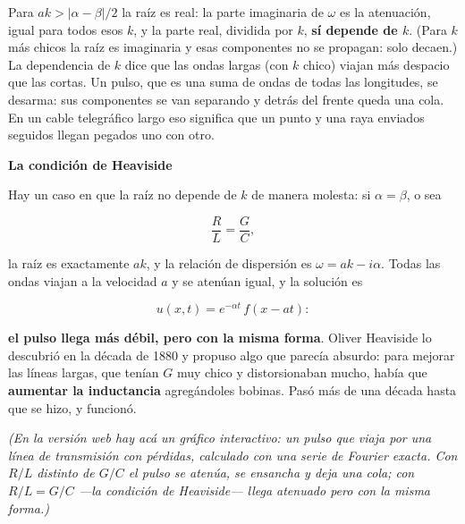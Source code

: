 \documentclass[
  spanish,
  a4paper,
]{scrbook}
\theoremstyle{definition}
\theoremstyle{plain}
\theoremstyle{definition}
\theoremstyle{plain}
\theoremstyle{definition}
\theoremstyle{remark}
\begin{document}
Para \(ak > |\alpha-\beta|/2\) la raíz es real: la parte imaginaria de
\(\omega\) es la atenuación, igual para todos esos \(k\), y la parte
real, dividida por \(k\), \textbf{sí depende de \(k\)}. (Para \(k\) más
chicos la raíz es imaginaria y esas componentes no se propagan: solo
decaen.) La dependencia de \(k\) dice que las ondas largas (con \(k\)
chico) viajan más despacio que las cortas. Un pulso, que es una suma de
ondas de todas las longitudes, se desarma: sus componentes se van
separando y detrás del frente queda una cola. En un cable telegráfico
largo eso significa que un punto y una raya enviados seguidos llegan
pegados uno con otro.

\begin{tcolorbox}[enhanced jigsaw, arc=.35mm, bottomrule=.15mm, breakable, colback=white, colframe=quarto-callout-important-color-frame, left=2mm, leftrule=.75mm, opacityback=0, rightrule=.15mm, toprule=.15mm]
\begin{minipage}[t]{5.5mm}
\textcolor{quarto-callout-important-color}{\faExclamation}
\end{minipage}%
\begin{minipage}[t]{\textwidth - 5.5mm}

\vspace{-3mm}\textbf{La condición de Heaviside}\vspace{3mm}

Hay un caso en que la raíz no depende de \(k\) de manera molesta: si
\(\alpha = \beta\), o sea

\[
\frac{R}{L} = \frac{G}{C},
\]

la raíz es exactamente \(ak\), y la relación de dispersión es
\(\omega = ak - i\alpha\). Todas las ondas viajan a la velocidad \(a\) y
se atenúan igual, y la solución es

\[
u(x,t) = e^{-\alpha t}\,f(x - at) :
\]

\textbf{el pulso llega más débil, pero con la misma forma}. Oliver
Heaviside lo descubrió en la década de 1880 y propuso algo que parecía
absurdo: para mejorar las líneas largas, que tenían \(G\) muy chico y
distorsionaban mucho, había que \textbf{aumentar la inductancia}
agregándoles bobinas. Pasó más de una década hasta que se hizo, y
funcionó.

\end{minipage}%
\end{tcolorbox}

\emph{(En la versión web hay acá un gráfico interactivo: un pulso que
viaja por una línea de transmisión con pérdidas, calculado con una serie
de Fourier exacta. Con \(R/L\) distinto de \(G/C\) el pulso se atenúa,
se ensancha y deja una cola; con \(R/L = G/C\) ---la condición de
Heaviside--- llega atenuado pero con la misma forma.)}
\end{document}
